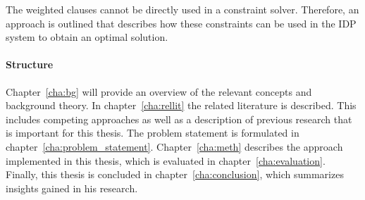 The weighted clauses cannot be directly used in a constraint solver.
Therefore, an approach is outlined that describes how these constraints can be used in the IDP system to obtain an optimal solution.

\paragraph{Structure}
Chapter~\ref{cha:bg} will provide an overview of the relevant concepts and background theory. In chapter~\ref{cha:rellit} the related literature is described. This includes competing approaches as well as a description of previous research that is important for this thesis. The problem statement is formulated in chapter~\ref{cha:problem_statement}. Chapter~\ref{cha:meth} describes the approach implemented in this thesis, which is evaluated in chapter~\ref{cha:evaluation}. Finally, this thesis is concluded in chapter~\ref{cha:conclusion}, which summarizes insights gained in his research.